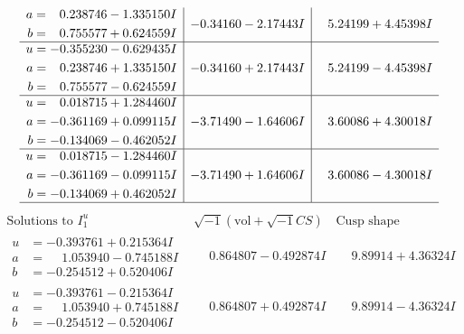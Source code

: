 \documentclass[1p]{elsarticle_modified}
\theoremstyle{definition}
\newcommand{\I}{\sqrt{-1}}
\begin{document}
$$\begin{array}{c|c|c}
\begin{aligned}
a &= \phantom{-}0.238746 - 1.335150 I \\
b &= \phantom{-}0.755577 + 0.624559 I\end{aligned}
 & -0.34160 - 2.17443 I & \phantom{-}5.24199 + 4.45398 I \\ \hline\begin{aligned}
u &= -0.355230 - 0.629435 I \\
a &= \phantom{-}0.238746 + 1.335150 I \\
b &= \phantom{-}0.755577 - 0.624559 I\end{aligned}
 & -0.34160 + 2.17443 I & \phantom{-}5.24199 - 4.45398 I \\ \hline\begin{aligned}
u &= \phantom{-}0.018715 + 1.284460 I \\
a &= -0.361169 + 0.099115 I \\
b &= -0.134069 - 0.462052 I\end{aligned}
 & -3.71490 - 1.64606 I & \phantom{-}3.60086 + 4.30018 I \\ \hline\begin{aligned}
u &= \phantom{-}0.018715 - 1.284460 I \\
a &= -0.361169 - 0.099115 I \\
b &= -0.134069 + 0.462052 I\end{aligned}
 & -3.71490 + 1.64606 I & \phantom{-}3.60086 - 4.30018 I\\
 \hline 
 \end{array}$$\newpage$$\begin{array}{c|c|c}  
\text{Solutions to }I^u_{1}& \I (\text{vol} + \sqrt{-1}CS) & \text{Cusp shape}\\
 \hline 
\begin{aligned}
u &= -0.393761 + 0.215364 I \\
a &= \phantom{-}1.053940 - 0.745188 I \\
b &= -0.254512 + 0.520406 I\end{aligned}
 & \phantom{-}0.864807 - 0.492874 I & \phantom{-}9.89914 + 4.36324 I \\ \hline\begin{aligned}
u &= -0.393761 - 0.215364 I \\
a &= \phantom{-}1.053940 + 0.745188 I \\
b &= -0.254512 - 0.520406 I\end{aligned}
 & \phantom{-}0.864807 + 0.492874 I & \phantom{-}9.89914 - 4.36324 I \\ \hline\begin{aligned}

\end{aligned}
\end{array}$$
\end{document}
